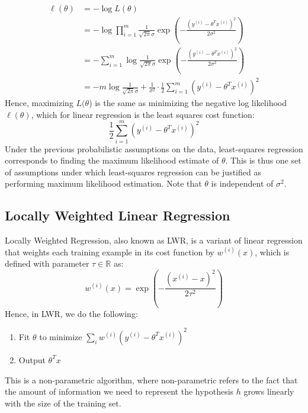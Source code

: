 \documentclass[twoside,twocolumn]{article}
\begin{document}
\begin{equation}
  \begin{aligned}
    \ell ( \theta ) & = - \log L ( \theta ) \\
    & = - \log \prod _ { i = 1 } ^ { m } \frac { 1 } { \sqrt { 2 \pi } \sigma } \exp \left( - \frac { \left( y ^ { ( i ) } - \theta ^ { T } x ^ { ( i ) } \right) ^ { 2 } } { 2 \sigma ^ { 2 } } \right) \\
    & = - \sum _ { i = 1 } ^ { m } \log \frac { 1 } { \sqrt { 2 \pi } \sigma } \exp \left( - \frac { \left( y ^ { ( i ) } - \theta ^ { T } x ^ { ( i ) } \right) ^ { 2 } } { 2 \sigma ^ { 2 } } \right) \\
    & = - m \log \frac { 1 } { \sqrt { 2 \pi } \sigma } + \frac { 1 } { \sigma ^ { 2 } } \cdot \frac { 1 } { 2 } \sum _ { i = 1 } ^ { m } \left( y ^ { ( i ) } - \theta ^ { T } x ^ { ( i ) } \right) ^ { 2 }
  \end{aligned}
\end{equation}
Hence, maximizing $L(\theta$) is the same as minimizing the negative log
likelihood $\ell(\theta)$, which for linear regression is the least squares
cost function:
\begin{equation}
  \frac { 1 } { 2 } \sum _ { i = 1 } ^ { m } \left( y ^ { ( i ) } - \theta ^ { T } x ^ { ( i ) } \right) ^ { 2 }
\end{equation}
Under the previous probabilistic assumptions on the data, least-squares
regression corresponds to finding the maximum likelihood estimate of $\theta$.
This is thus one set of assumptions under which least-squares regression
can be justified as performing maximum likelihood estimation. Note that $\theta$
is independent of $\sigma^2$.
\subsection{Locally Weighted Linear Regression}
Locally Weighted Regression, also known as LWR, is a variant of
linear regression that weights each training example in its cost function by
$w^{(i)}(x)$, which is defined with parameter $\tau \in \mathbb{R}$ as:
\begin{equation}
  w^{(i)}(x)=\exp\left(-\frac{(x^{(i)}-x)^2}{2\tau^2}\right)
\end{equation}
Hence, in LWR, we do the following:
\begin{enumerate}
  \item Fit $\theta$ to minimize $\sum_i w^{(i)} \left( y^{(i)} - \theta^{T} x^{(i)} \right)^{2}$
  \item Output $\theta^T x$
\end{enumerate}
This is a non-parametric algorithm, where non-parametric refers to the fact
that the amount of information we need to represent the hypothesis $h$ grows
linearly with the size of the training set.
\end{document}
